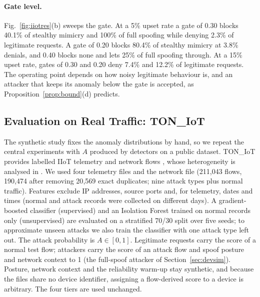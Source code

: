 \begin{table}[t]
\centering
\caption{Per-tier results: legitimate requests allowed and attacker requests accepted (\%), threshold alone $\to$ full policy ($\theta$ min.\ trust, $g$ anomaly gate)}
\label{tab:tiersres}
\scriptsize
\setlength{\tabcolsep}{2.2pt}

\end{table}

\paragraph{Gate level.}\label{sec:gate_eval} Fig.~\ref{fig:iiotres}(b) sweeps the gate. At a 5\% upset rate a gate of 0.30 blocks 40.1\% of stealthy mimicry and 100\% of full spoofing while denying 2.3\% of legitimate requests. A gate of 0.20 blocks 80.4\% of stealthy mimicry at 3.8\% denials, and 0.40 blocks none and lets 25\% of full spoofing through. At a 15\% upset rate, gates of 0.30 and 0.20 deny 7.4\% and 12.2\% of legitimate requests. The operating point depends on how noisy legitimate behaviour is, and an attacker that keeps its anomaly below the gate is accepted, as Proposition~\ref{prop:bound}(d) predicts.

\subsection{Evaluation on Real Traffic: TON\_IoT}\label{sec:real_eval}
The synthetic study fixes the anomaly distributions by hand, so we repeat the central experiments with $A$ produced by detectors on a public dataset. TON\_IoT provides labelled IIoT telemetry \cite{alsaedi2020ton} and network flows \cite{moustafa2021network}, whose heterogeneity is analysed in \cite{booij2022ton}. We used four telemetry files and the network file (211{,}043 flows, 190{,}474 after removing 20{,}569 exact duplicates; nine attack types plus normal traffic). Features exclude IP addresses, source ports and, for telemetry, dates and times (normal and attack records were collected on different days). A gradient-boosted classifier (supervised) and an Isolation Forest trained on normal records only (unsupervised) are evaluated on a stratified 70/30 split over five seeds; to approximate unseen attacks we also train the classifier with one attack type left out. The attack probability is $A\in[0,1]$. Legitimate requests carry the score of a normal test flow; attackers carry the score of an attack flow and spoof posture and network context to 1 (the full-spoof attacker of Section~\ref{sec:devsim}). Posture, network context and the reliability warm-up stay synthetic, and because the files share no device identifier, assigning a flow-derived score to a device is arbitrary. The four tiers are used unchanged.

